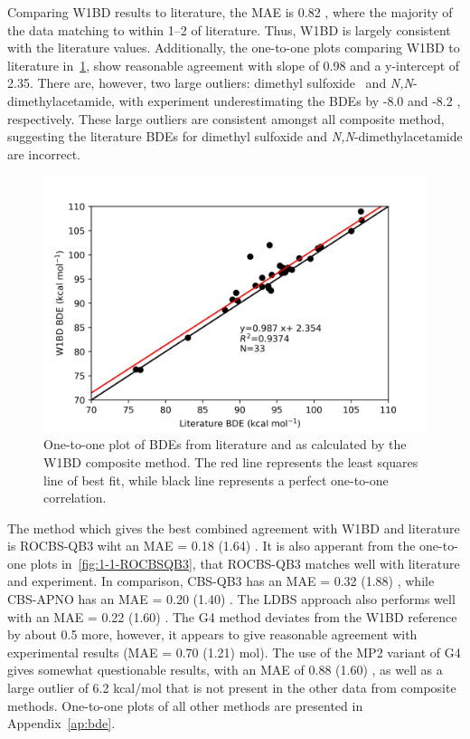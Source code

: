 Comparing W1BD results to literature, the MAE is 0.82 \kcalmol, where the majority of the data matching to within 1--2 \kcalmol of literature. Thus, W1BD is largely consistent with the literature values. Additionally, the one-to-one plots comparing W1BD to literature in~\ref{fig:1-1-W1BD}, show reasonable agreement with slope of 0.98 and a y-intercept of 2.35. There are, however, two large outliers: dimethyl sulfoxide\footnotemark~ and \emph{N,N}-dimethylacetamide, with experiment underestimating the BDEs by -8.0 and -8.2 \kcalmol, respectively. These large outliers are consistent amongst all composite method, suggesting the literature BDEs for dimethyl sulfoxide and \emph{N,N}-dimethylacetamide are incorrect.


\begin{figure}[H]
  \centering
  \includegraphics[width=\textwidth]{figures/lit-w1bd}
  \caption[One-to-one plot of BDEs from literature and as calculated by the W1BD composite method.]{One-to-one plot of BDEs from literature\protect\cite{Luo2002} and as calculated by the W1BD composite method. The red line represents the least squares line of best fit, while black line represents a perfect one-to-one correlation.}
  \label{fig:1-1-W1BD}
\end{figure}

The method which gives the best combined agreement with W1BD and literature is ROCBS-QB3 wiht an MAE = 0.18 (1.64) \kcalmol. It is also apperant from the one-to-one plots in~\ref{fig:1-1-ROCBSQB3}, that ROCBS-QB3 matches well with literature and experiment. In comparison, CBS-QB3 has an MAE = 0.32 (1.88) \kcalmol, while CBS-APNO has an MAE = 0.20 (1.40) \kcalmol. The LDBS approach also performs well with an MAE = 0.22 (1.60) \kcalmol. The G4 method deviates from the W1BD reference by about 0.5 \kcalmol more, however, it appears to give reasonable agreement with experimental results (MAE = 0.70 (1.21) mol). The use of the MP2 variant of G4 gives somewhat questionable results, with an MAE of 0.88 (1.60) \kcalmol, as well as a large outlier of 6.2 kcal/mol that is not present in the other data from composite methods. One-to-one plots of all other methods are presented in Appendix~\ref{ap:bde}.

